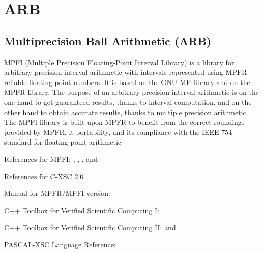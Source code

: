 %
%
%
%
%



\chapter{ARB}



\section{Multiprecision Ball Arithmetic (ARB)}
MPFI (Multiple Precision Floating-Point Interval Library) is a library for arbitrary precision interval arithmetic with intervals represented using MPFR reliable floating-point numbers. It is based on the GNU MP library and on the MPFR library. The purpose of an arbitrary precision interval arithmetic is on the one hand to get guaranteed results, thanks to interval computation, and on the other hand to obtain accurate results, thanks to multiple precision arithmetic. The MPFI library is built upon MPFR to benefit from the correct roundings provided by MPFR, it portability, and its compliance with the IEEE 754 standard for floating-point arithmetic

References for MPFI: \cite{MPFI_2005}, \cite{Moore_2009},  \cite{Hayer2003},  and \cite{INTLAB_1999}

References for C-XSC 2.0  \cite{Hofschuster2004}

Manual for MPFR/MPFI version: \cite{Blomquist2012}


C++ Toolbox for Verified Scientific Computing I:   \cite{Hammer1995}

C++ Toolbox for Verified Scientific Computing II:   \cite{Kramer1994} and \cite{Kramer2006}

PASCAL-XSC Language Reference: \cite{Klatte1991}

